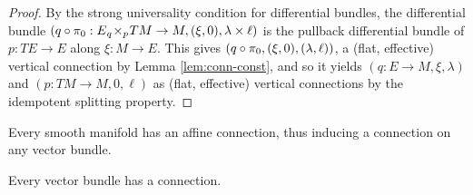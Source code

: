 \begin{proof}
  By the strong universality condition for differential bundles, the differential bundle $(q\circ\pi_0: E {_{q}}\!\times_{p}\! TM \to M, (\xi, 0), \lambda \times \ell)$ is the pullback differential bundle of $p:TE \to E$ along $\xi:M \to E$. 
  This gives $(q\circ\pi_0, (\xi,0), (\lambda,\ell))$, a (flat, effective) vertical connection by Lemma \ref{lem:conn-const}, and so it yields $(q:E \to M, \xi, \lambda)$ and $(p:TM \to M, 0, \ell)$ as (flat, effective) vertical connections by the idempotent splitting property.
\end{proof}
Every smooth manifold has an affine connection, thus inducing a connection on any vector bundle.
\begin{corollary}
  Every vector bundle has a connection.
\end{corollary}



